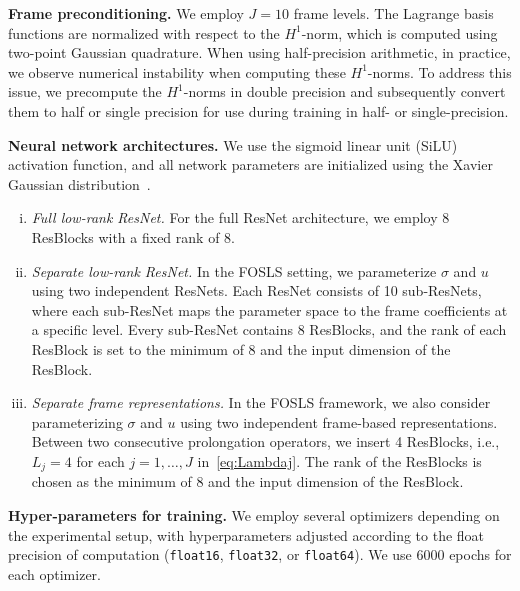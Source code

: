 \documentclass[a4paper,11pt]{amsart}
\numberwithin{equation}{section}
\theoremstyle{definition}
\theoremstyle{remark}
\theoremstyle{plain}
\begin{document}
\textbf{Frame preconditioning.}
We employ $J=10$ frame levels. The Lagrange basis functions are normalized with respect to the $H^{1}$-norm, which is computed using two-point Gaussian quadrature. When using half-precision arithmetic, in practice, we observe numerical instability when computing these $H^{1}$-norms. To address this issue, we precompute the $H^{1}$-norms in double precision and subsequently convert them to half or single precision for use during training in half- or single-precision.

\textbf{Neural network architectures.}
We use the sigmoid linear unit (SiLU)~\cite{Elfwing2018Sigmoid,ramachandran2017Swish} activation function, and all network parameters are initialized using the Xavier Gaussian distribution~\cite{Glorot2010Understanding}.
\begin{enumerate}[(i)]
\item \emph{Full low-rank ResNet.}
For the full ResNet architecture, we employ 8 ResBlocks with a fixed rank of 8.
\item \emph{Separate low-rank ResNet.}
In the FOSLS setting, we parameterize $\sigma$ and $u$ using two independent ResNets. Each ResNet consists of 10 sub-ResNets, where each sub-ResNet maps the parameter space to the frame coefficients at a specific level. Every sub-ResNet contains 8 ResBlocks, and the rank of each ResBlock is set to the minimum of 8 and the input dimension of the ResBlock.
\item \emph{Separate frame representations.}
In the FOSLS framework, we also consider parameterizing $\sigma$ and $u$ using two independent frame-based representations. Between two consecutive prolongation operators, we insert 4 ResBlocks, i.e., $L_j = 4$ for each $j = 1,\ldots,J$ in~\eqref{eq:Lambdaj}. The rank of the ResBlocks is chosen as the minimum of 8 and the input dimension of the ResBlock.
\end{enumerate}

\textbf{Hyper-parameters for training.} 
We employ several optimizers depending on the experimental setup, with hyperparameters adjusted according to the float precision of computation (\texttt{float16}, \texttt{float32}, or \texttt{float64}). We use 6000 epochs for each optimizer.
\end{document}
